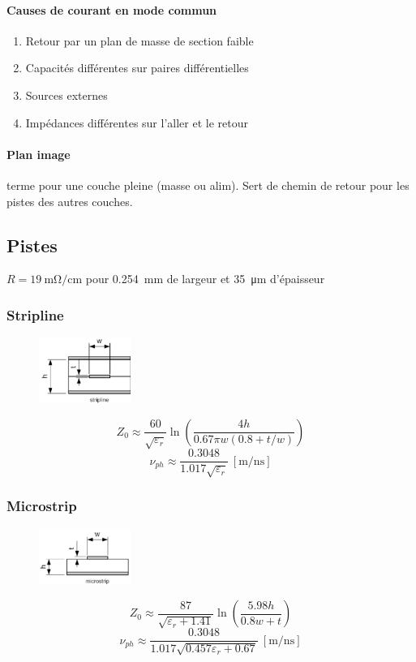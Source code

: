 \documentclass[resume]{subfiles}
\begin{document}
\begin{multicols}{3}
\paragraph{Causes de courant en mode commun}
\begin{enumerate}
\item Retour par un plan de masse de section faible
\item Capacités différentes sur paires différentielles
\item Sources externes
\item Impédances différentes sur l'aller et le retour
\end{enumerate}
\paragraph{Plan image} terme pour une couche pleine (masse ou alim). Sert de chemin de retour pour les pistes des autres couches. 
\subsection{Pistes}
$R=\SI{19}{\milli\ohm\per\centi\meter}$ pour \SI{0.254}{\milli\meter} de largeur et \SI{35}{\micro\meter} d'épaisseur
\subsubsection{Stripline}
\begin{figure}[H]
\centering
\includegraphics[width=3.00cm]{img_15.png}
\end{figure}
$$Z_0\approx\frac{60}{\sqrt{\varepsilon_r}}\ln\left(\frac{4h}{0.67\pi w\left(0.8+t/w\right)}\right)$$
$$\nu_{ph}\approx\frac{0.3048}{1.017\sqrt{\varepsilon_r}}\ [\si{\meter\per\nano\second}]$$
\subsubsection{Microstrip}
\begin{figure}[H]
\centering
\includegraphics[width=3.00cm]{img_16.png}
\end{figure}
$$Z_0\approx \frac{87}{\sqrt{\varepsilon_r+1.41}}\ln\left(\frac{5.98h}{0.8w+t}\right)$$
$$\nu_{ph}\approx\frac{0.3048}{1.017\sqrt{0.457\varepsilon_r+0.67}}\ [\si{\meter\per\nano\second}]$$


\end{multicols}
\end{document}
